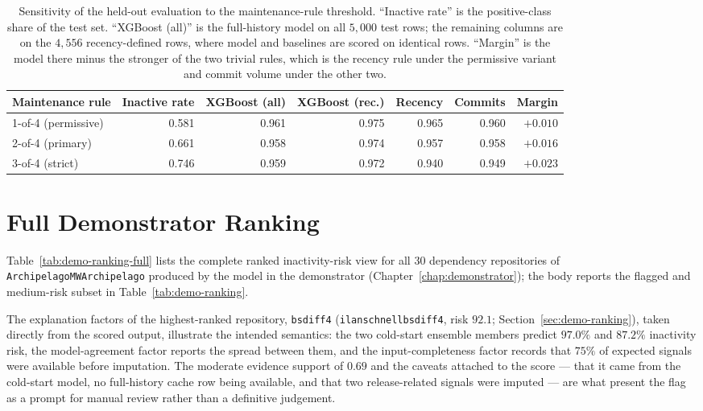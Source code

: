 \clearpage
\begin{table}[htbp]
  \centering
  \small
  \setlength{\tabcolsep}{3.5pt}
  \caption{Sensitivity of the held-out evaluation to the maintenance-rule
  threshold. ``Inactive rate'' is the positive-class share of the test set.
  ``XGBoost (all)'' is the full-history model on all \(5{,}000\) test rows; the
  remaining columns are on the \(4{,}556\) recency-defined rows, where model and
  baselines are scored on identical rows. ``Margin'' is the model there minus
  the stronger of the two trivial rules, which is the recency rule under the
  permissive variant and commit volume under the other two.}
  \label{tab:label-sensitivity}
  \begin{tabular}{lrrrrrr}
    \toprule
    Maintenance rule & Inactive rate & XGBoost (all) & XGBoost (rec.) & Recency & Commits & Margin \\
    \midrule
    1-of-4 (permissive) & 0.581 & 0.961 & 0.975 & 0.965 & 0.960 & \(+0.010\) \\
    2-of-4 (primary)    & 0.661 & 0.958 & 0.974 & 0.957 & 0.958 & \(+0.016\) \\
    3-of-4 (strict)     & 0.746 & 0.959 & 0.972 & 0.940 & 0.949 & \(+0.023\) \\
    \bottomrule
  \end{tabular}
\end{table}
\section{Full Demonstrator Ranking}
\label{appendix:demo-full}

Table~\ref{tab:demo-ranking-full} lists the complete ranked inactivity-risk view for all 30 dependency repositories of \texttt{ArchipelagoMW\sslash Archipelago} produced by the model in the demonstrator (Chapter~\ref{chap:demonstrator}); the body reports the flagged and medium-risk subset in Table~\ref{tab:demo-ranking}.

The explanation factors of the highest-ranked repository, \texttt{bsdiff4} (\texttt{ilanschnell\sslash bsdiff4}, risk \(92.1\); Section~\ref{sec:demo-ranking}), taken directly from the scored output, illustrate the intended semantics: the two cold-start ensemble members predict \(97.0\%\) and \(87.2\%\) inactivity risk, the model-agreement factor reports the spread between them, and the input-completeness factor records that \(75\%\) of expected signals were available before imputation. The moderate evidence support of \(0.69\) and the caveats attached to the score --- that it came from the cold-start model, no full-history cache row being available, and that two release-related signals were imputed --- are what present the flag as a prompt for manual review rather than a definitive judgement.

